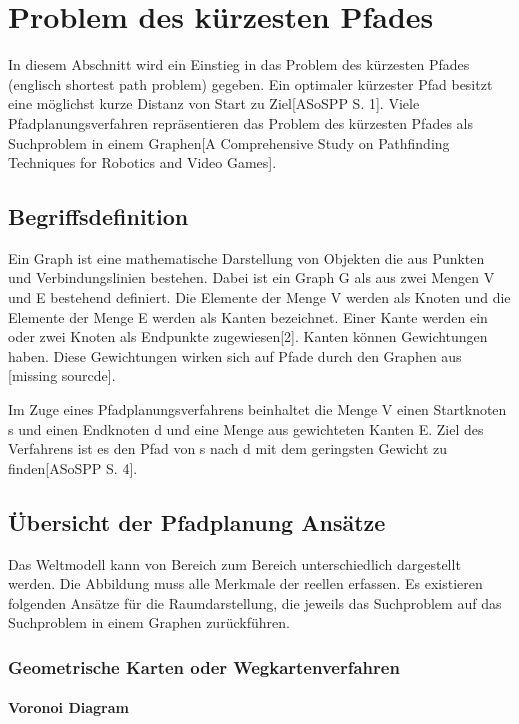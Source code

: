 \chapter{Problem des kürzesten Pfades}

In diesem Abschnitt wird ein Einstieg in das Problem des kürzesten Pfades (englisch shortest path problem) gegeben. Ein optimaler kürzester Pfad besitzt eine möglichst kurze Distanz von Start zu Ziel[ASoSPP S. 1]. Viele Pfadplanungsverfahren repräsentieren das Problem des kürzesten Pfades als Suchproblem in einem Graphen[A Comprehensive Study on Pathfinding Techniques for Robotics and Video Games].

\section{Begriffsdefinition}

Ein Graph ist eine mathematische Darstellung von Objekten die aus Punkten und Verbindungslinien bestehen. Dabei ist ein Graph G als aus zwei Mengen V und E bestehend definiert. Die Elemente der Menge V werden als Knoten und die Elemente der Menge E werden als Kanten bezeichnet. Einer Kante werden ein oder zwei Knoten als Endpunkte zugewiesen[2]. Kanten können Gewichtungen haben. Diese Gewichtungen wirken sich auf Pfade durch den Graphen aus [missing sourcde]. 

Im Zuge eines Pfadplanungsverfahrens beinhaltet die Menge V einen Startknoten s und einen Endknoten d und eine Menge aus gewichteten Kanten E. Ziel des Verfahrens ist es den Pfad von s nach d mit dem geringsten Gewicht zu finden[ASoSPP S. 4]. 

\section{Übersicht der Pfadplanung Ansätze}

Das Weltmodell kann von Bereich zum Bereich unterschiedlich dargestellt werden. Die Abbildung muss alle Merkmale der reellen erfassen.  Es existieren folgenden Ansätze für die Raumdarstellung, die jeweils das Suchproblem auf das Suchproblem in einem Graphen zurückführen.

\subsection{Geometrische Karten oder Wegkartenverfahren}

\subsubsection{Voronoi Diagram}

